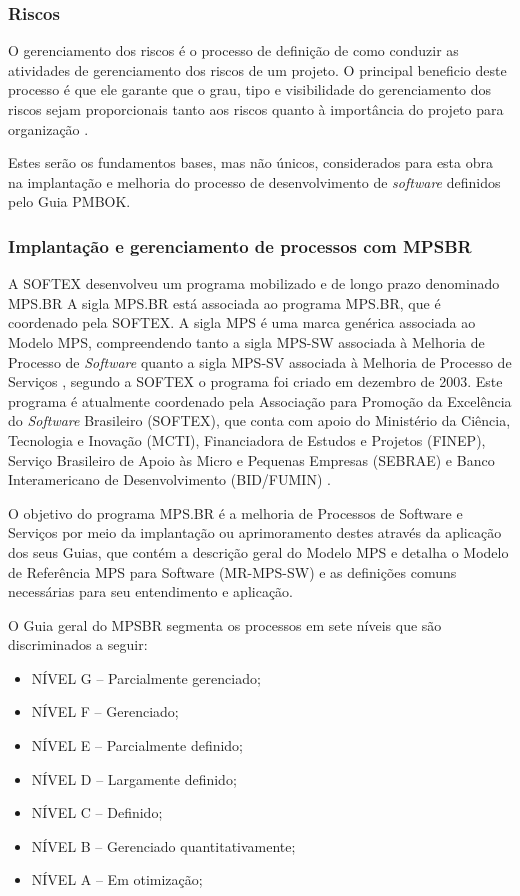 \documentclass{acm_proc_article-sp}
\begin{document}
\subsubsection*{Riscos}
O gerenciamento dos riscos é o processo de definição de como conduzir as atividades de gerenciamento dos riscos de um projeto. O principal beneficio deste processo é que ele garante que o grau, tipo e visibilidade do gerenciamento dos riscos sejam proporcionais tanto aos riscos quanto à importância do projeto para organização \cite{pmbok:nAgil}.


Estes serão os fundamentos bases, mas não únicos, considerados para esta obra na implantação e melhoria do processo de desenvolvimento de \textit{software} definidos pelo Guia PMBOK. 

\subsubsection{Implantação e gerenciamento de processos com MPSBR}
A SOFTEX desenvolveu um programa mobilizado e de longo prazo denominado MPS.BR  A sigla
MPS.BR está associada ao programa MPS.BR, que é coordenado pela SOFTEX. A sigla MPS é uma
marca genérica associada ao Modelo MPS, compreendendo tanto a sigla MPS-SW associada à
Melhoria de Processo de \textit{Software} quanto a sigla MPS-SV associada à Melhoria de Processo de
Serviços \cite{mpsbr:nAgil}, segundo a SOFTEX o programa foi criado em dezembro de 2003. Este programa é atualmente coordenado pela Associação para Promoção da Excelência do \textit{Software} Brasileiro (SOFTEX), que conta com apoio do Ministério da Ciência, Tecnologia e Inovação (MCTI), Financiadora de Estudos e Projetos (FINEP), Serviço Brasileiro de Apoio às Micro e Pequenas Empresas (SEBRAE) e Banco Interamericano de Desenvolvimento (BID/FUMIN) \cite{mpsbr:nAgil}.

O objetivo do programa MPS.BR é a melhoria de Processos de Software e Serviços por meio da implantação ou aprimoramento destes através da aplicação dos seus Guias, que contém a descrição geral do Modelo MPS e detalha o Modelo
de Referência MPS para Software (MR-MPS-SW) e as definições comuns necessárias para seu entendimento e aplicação. 

O Guia geral do MPSBR segmenta os processos em sete níveis que são discriminados a seguir:

\begin{itemize}
\item NÍVEL G – Parcialmente gerenciado;
\item NÍVEL F – Gerenciado;
\item NÍVEL E – Parcialmente definido;
\item NÍVEL D – Largamente definido;
\item NÍVEL C – Definido;
\item NÍVEL B – Gerenciado quantitativamente;
\item NÍVEL A – Em otimização;
\end{itemize}
\end{document}
